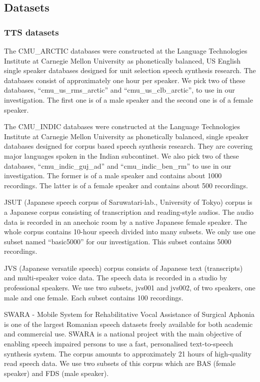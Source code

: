 \documentclass[12pt]{article}
\begin{document}
\subsection{Datasets}

\subsubsection{TTS datasets}
The CMU\_ARCTIC databases were constructed at the Language Technologies Institute at Carnegie Mellon University as phonetically balanced, US English single speaker databases designed for unit selection speech synthesis research. The databases consist of approximately one hour per speaker. We pick two of these databases, “cmu\_us\_rms\_arctic” and “cmu\_us\_clb\_arctic”, to use in our investigation. The first one is of a male speaker and the second one is of a female speaker.

The CMU\_INDIC databases were constructed at the Language Technologies Institute at Carnegie Mellon University as phonetically balanced, single speaker databases designed for corpus based speech synthesis research. They are covering major languages spoken in the Indian subcontinet. We also pick two of these databases, “cmu\_indic\_guj\_ad” and “cmu\_indic\_ben\_rm” to use in our investigation. The former is of a male speaker and contains about 1000 recordings. The latter is of a female speaker and contains about 500 recordings.

JSUT (Japanese speech corpus of Saruwatari-lab., University of Tokyo) corpus is a Japanese corpus consisting of transcription and reading-style audios. The audio data is recorded in an anechoic room by a native Japanese female speaker. The whole corpus contains 10-hour speech divided into many subsets. We only use one subset named “basic5000” for our investigation. This subset contains 5000 recordings.

JVS (Japanese versatile speech) corpus consists of Japanese text (transcripts) and multi-speaker voice data. The speech data is recorded in a studio by professional speakers. We use two subsets, jvs001 and jvs002, of two speakers, one male and one female. Each subset contains 100 recordings.

SWARA - Mobile System for Rehabilitative Vocal Assistance of Surgical Aphonia is one of the largest Romanian speech datasets freely available for both academic and commercial use. SWARA is a national project with the main objective of enabling speech impaired persons to use a fast, personalised text-to-speech synthesis system. The corpus amounts to approximately 21 hours of high-quality read speech data. We use two subsets of this corpus which are BAS (female speaker) and FDS (male speaker).
\end{document}
